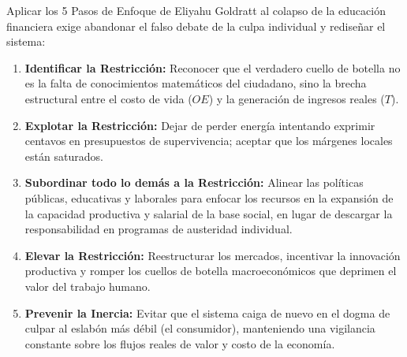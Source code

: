 \documentclass[12pt,letterpaper]{article}
\providecommand{\tightlist}{%
  \setlength{\itemsep}{0pt}\setlength{\parskip}{0pt}}
\begin{document}
Aplicar los 5 Pasos de Enfoque de Eliyahu Goldratt al colapso de la
educación financiera exige abandonar el falso debate de la culpa
individual y rediseñar el sistema:

\begin{enumerate}
\def\labelenumi{\arabic{enumi}.}
\tightlist
\item
  \textbf{Identificar la Restricción:} Reconocer que el verdadero cuello
  de botella no es la falta de conocimientos matemáticos del ciudadano,
  sino la brecha estructural entre el costo de vida (\(OE\)) y la
  generación de ingresos reales (\(T\)).
\item
  \textbf{Explotar la Restricción:} Dejar de perder energía intentando
  exprimir centavos en presupuestos de supervivencia; aceptar que los
  márgenes locales están saturados.
\item
  \textbf{Subordinar todo lo demás a la Restricción:} Alinear las
  políticas públicas, educativas y laborales para enfocar los recursos
  en la expansión de la capacidad productiva y salarial de la base
  social, en lugar de descargar la responsabilidad en programas de
  austeridad individual.
\item
  \textbf{Elevar la Restricción:} Reestructurar los mercados, incentivar
  la innovación productiva y romper los cuellos de botella
  macroeconómicos que deprimen el valor del trabajo humano.
\item
  \textbf{Prevenir la Inercia:} Evitar que el sistema caiga de nuevo en
  el dogma de culpar al eslabón más débil (el consumidor), manteniendo
  una vigilancia constante sobre los flujos reales de valor y costo de
  la economía.
\end{enumerate}
\end{document}
